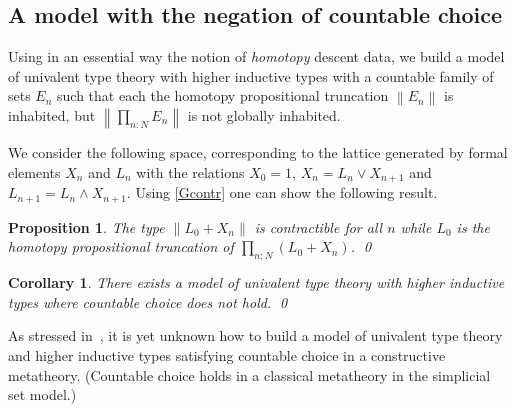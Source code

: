 \documentclass[10pt,a4paper,draft]{article}
\def\norm#1{\left\|#1\right\|}
\newcommand{\E}{E}
\renewcommand{\~}{\widetilde}
\newtheorem{corollary}[theorem]{Corollary}
\newtheorem{proposition}[theorem]{Proposition}
\theoremstyle{definition}
\theoremstyle{remark} %
\begin{document}
\subsection{A model with the negation of countable choice}


  Using in an essential way the notion of {\em homotopy} descent data, we build a model
  of univalent type theory with higher inductive types
  with a countable family of sets $\E_n$ such that each the homotopy propositional truncation $\norm{\E_n}$ is inhabited,
  but $\norm{\prod_{n:N} \E_n}$ is not globally inhabited.

We consider the following space, corresponding to the lattice generated by formal elements $X_n$
and $L_n$ with the relations $X_0 = 1$, $X_n = L_n\vee X_{n+1}$ and $L_{n+1} = L_n\wedge X_{n+1}$.
Using \cref{Gcontr} one can show the following result.

\begin{proposition}\label{counter}
  The type $\norm{L_0+X_n}$ is contractible for all $n$
  while $L_0$ is the homotopy propositional truncation of $\prod_{n:N} (L_0 + X_n)$.
\qed
\end{proposition}

\begin{corollary}
  There exists a model of univalent type theory with higher inductive types where countable choice does not
  hold.
\qed
\end{corollary}

As stressed in~\cite{SwanU19}, it is yet unknown how to build a model of univalent type
theory and higher inductive types satisfying countable choice in a constructive metatheory.
(Countable choice holds in a classical metatheory in the simplicial set model.)

\end{document}
